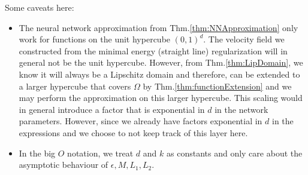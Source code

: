 \begin{remark}
Some caveats here: 
\begin{itemize}
    \item The neural network approximation from Thm.\ref{thm:NNApproximation} only work for functions on the unit hypercube $(0,1)^d$. The velocity field we constructed from the minimal energy (straight line) regularization will in general not be the unit hypercube. However, from Thm.\ref{thm:LipDomain}, we know it will always be a Lipschitz domain and therefore, can be extended to a larger hypercube that covers $\Omega$ by Thm.\ref{thm:functionExtension} and we may perform the approximation on this larger hypercube. This scaling would in general introduce a factor that is exponential in $d$ in the network parameters. However, since we already have factors exponential in $d$ in the expressions and we choose to not keep track of this layer here. 
    \item In the big $O$ notation, we treat $d$ and $k$ as constants and only care about the asymptotic behaviour of $\epsilon, M, L_1, L_2$. 
  
\end{itemize}
\end{remark}





